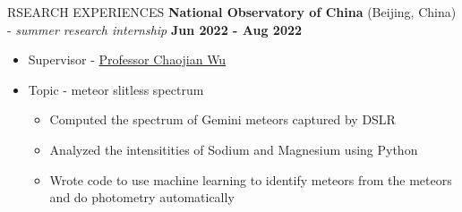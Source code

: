 \documentclass[11pt]{article}
\begin{document}
\begin{section}{RSEARCH EXPERIENCES}
\textbf{National Observatory of China} (Beijing, China) - \textit{summer research internship} \hfill \textbf{Jun 2022 - Aug 2022}
\begin{itemize}[leftmargin=1.5em]
    \item Supervisor - \href{mailto:chjwu@bao.ac.cn}{Professor Chaojian Wu}
    \item Topic - meteor slitless spectrum
    \begin{itemize}[leftmargin=1.5em]
        \item Computed the spectrum of Gemini meteors captured by DSLR
        \item Analyzed the intensitities of Sodium and Magnesium using Python
        \item Wrote code to use machine learning to identify meteors from the meteors and do photometry automatically
    \end{itemize}
\end{itemize}


\end{section}
\end{document}
